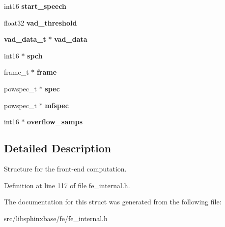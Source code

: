 \begin{DoxyCompactItemize}
\mbox{\label{structfe__s_a93290323d05eb26e0dfe423a9b27063a}} 
int16 {\bfseries start\+\_\+speech}
\item 
\mbox{\label{structfe__s_a8c484564cca88e8aec167fe94bd27891}} 
float32 {\bfseries vad\+\_\+threshold}
\item 
\mbox{\label{structfe__s_aaae66e5327a74c4270c8f0decd4d4389}} 
\textbf{ vad\+\_\+data\+\_\+t} $\ast$ {\bfseries vad\+\_\+data}
\item 
\mbox{\label{structfe__s_a7d49693c1fa1b14bbcd25b87ad97935b}} 
int16 $\ast$ {\bfseries spch}
\item 
\mbox{\label{structfe__s_a6fe89784eb5d23ee812439f427d33fe6}} 
frame\+\_\+t $\ast$ {\bfseries frame}
\item 
\mbox{\label{structfe__s_af455b0ee3f8d81ca84ac88d4ea04e860}} 
powspec\+\_\+t $\ast$ {\bfseries spec}
\item 
\mbox{\label{structfe__s_a87fd448109884fc3d796b926b67697e7}} 
powspec\+\_\+t $\ast$ {\bfseries mfspec}
\item 
\mbox{\label{structfe__s_a7975216c6a540fa498352736404797b1}} 
int16 $\ast$ {\bfseries overflow\+\_\+samps}
\end{DoxyCompactItemize}


\subsection{Detailed Description}
Structure for the front-\/end computation. 



Definition at line 117 of file fe\+\_\+internal.\+h.



The documentation for this struct was generated from the following file\+:\begin{DoxyCompactItemize}
\item 
src/libsphinxbase/fe/fe\+\_\+internal.\+h\end{DoxyCompactItemize}
